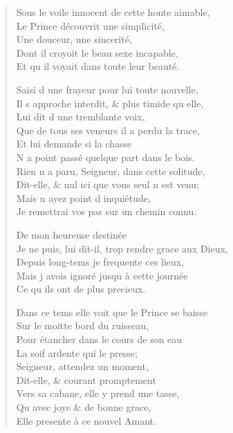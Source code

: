 \begin{verse}
Sous le voile innocent de cette honte aimable, \\
Le Prince découvrit une simplicité, \\
\vin Une douceur, une sincerité, \\
\vin Dont il croyoit le beau sexe incapable, \\
\vin Et qu\textquotesingle{} il voyait dans toute leur beauté.

Saisi d\textquotesingle{} une frayeur pour lui toute nouvelle, \\
Il s\textquotesingle{} approche interdit, \& plus timide qu\textquotesingle{} elle, \\
\vin Lui dit d\textquotesingle{} une tremblante voix, \\
Que de tous ses veneurs il a perdu la trace, \\
\vin Et lui demande si la chasse \\
\vin N\textquotesingle{} a point passé quelque part dans le bois. \\
Rien n\textquotesingle{} a paru, Seigneur, dans cette solitude, \\
Dit-elle, \& nul ici que vous seul n\textquotesingle{} est venu; \\
\vin Mais n\textquotesingle{} ayez point d\textquotesingle{} inquiétude, \\
Je remettrai vos pas sur un chemin connu.

\vin De mon heureuse destinée \\
Je ne puis, lui dit-il, trop rendre grace aux Dieux, \\
\vin Depuis long-tems je frequente ces lieux, \\
Mais j\textquotesingle{} avois ignoré jusqu\textquotesingle{} à cette journée \\
\vin Ce qu\textquotesingle{} ils ont de plus precieux.

Dans ce tems elle voit que le Prince se baisse \\
\vin Sur le moitte bord du ruisseau, \\
\vin Pour étancher dans le cours de son eau \\
\vin La soif ardente qui le presse; \\
\vin Seigneur, attendez un moment, \\
\vin Dit-elle, \& courant promptement \\
\vin Vers sa cabane, elle y prend une tasse, \\
\vin Qu\textquotesingle{} avec joye \& de bonne grace, \\
\vin Elle presente à ce nouvel Amant.


\end{verse}
